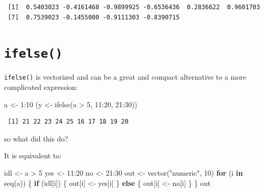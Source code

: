 \documentclass[
]{book}
\newenvironment{Shaded}{\begin{snugshade}}{\end{snugshade}}
\newcommand{\ControlFlowTok}[1]{\textcolor[rgb]{0.13,0.29,0.53}{\textbf{#1}}}
\newcommand{\DecValTok}[1]{\textcolor[rgb]{0.00,0.00,0.81}{#1}}
\newcommand{\FunctionTok}[1]{\textcolor[rgb]{0.00,0.00,0.00}{#1}}
\newcommand{\NormalTok}[1]{#1}
\newcommand{\OtherTok}[1]{\textcolor[rgb]{0.56,0.35,0.01}{#1}}
\newcommand{\SpecialCharTok}[1]{\textcolor[rgb]{0.00,0.00,0.00}{#1}}
\newcommand{\StringTok}[1]{\textcolor[rgb]{0.31,0.60,0.02}{#1}}
\begin{document}
\begin{verbatim}
 [1]  0.5403023 -0.4161468 -0.9899925 -0.6536436  0.2836622  0.9601703
 [7]  0.7539023 -0.1455000 -0.9111303 -0.8390715
\end{verbatim}

\hypertarget{ifelse}{%
\section{\texorpdfstring{\texttt{ifelse()}}{ifelse()}}\label{ifelse}}

\texttt{ifelse()} is vectorized and can be a great and compact alternative to a more complicated expression:

\begin{Shaded}
\begin{Highlighting}[]
\NormalTok{a }\OtherTok{\textless{}{-}} \DecValTok{1}\SpecialCharTok{:}\DecValTok{10}
\NormalTok{(y }\OtherTok{\textless{}{-}} \FunctionTok{ifelse}\NormalTok{(a }\SpecialCharTok{\textgreater{}} \DecValTok{5}\NormalTok{, }\DecValTok{11}\SpecialCharTok{:}\DecValTok{20}\NormalTok{, }\DecValTok{21}\SpecialCharTok{:}\DecValTok{30}\NormalTok{))}
\end{Highlighting}
\end{Shaded}

\begin{verbatim}
 [1] 21 22 23 24 25 16 17 18 19 20
\end{verbatim}

so what did this do?

It is equivalent to:

\begin{Shaded}
\begin{Highlighting}[]
\NormalTok{idl }\OtherTok{\textless{}{-}}\NormalTok{ a }\SpecialCharTok{\textgreater{}} \DecValTok{5}
\NormalTok{yes }\OtherTok{\textless{}{-}} \DecValTok{11}\SpecialCharTok{:}\DecValTok{20}
\NormalTok{no }\OtherTok{\textless{}{-}} \DecValTok{21}\SpecialCharTok{:}\DecValTok{30}
\NormalTok{out }\OtherTok{\textless{}{-}} \FunctionTok{vector}\NormalTok{(}\StringTok{"numeric"}\NormalTok{, }\DecValTok{10}\NormalTok{)}
\ControlFlowTok{for}\NormalTok{ (i }\ControlFlowTok{in} \FunctionTok{seq}\NormalTok{(a)) \{}
  \ControlFlowTok{if}\NormalTok{ (idl[i]) \{}
\NormalTok{    out[i] }\OtherTok{\textless{}{-}}\NormalTok{ yes[i]}
\NormalTok{  \} }\ControlFlowTok{else}\NormalTok{ \{}
\NormalTok{    out[i] }\OtherTok{\textless{}{-}}\NormalTok{ no[i]}
\NormalTok{  \}}
\NormalTok{\}}
\NormalTok{out}
\end{Highlighting}
\end{Shaded}
\end{document}
